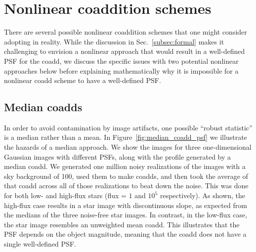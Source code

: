 \documentclass{openjournal}
\begin{document}
\section{Nonlinear coaddition schemes}\label{sec:nonlin}

There are several possible nonlinear coaddition schemes that one might consider adopting in reality.  While the discussion in Sec.~\ref{subsec:formal} makes it challenging to envision a nonlinear approach that would result in a well-defined PSF for the coadd, we discuss the specific issues with two potential nonlinear approaches below before explaining mathematically why it is impossible for a nonlinear coadd scheme to have a well-defined PSF.

\subsection{Median coadds}

In order to avoid contamination by image artifacts, one possible ``robust statistic'' is a median rather than a mean.  In Figure~\ref{fig:median_coadd_psf} we illustrate the hazards of a median approach.
We show the images for three one-dimensional Gaussian images with different PSFs, along with the profile generated by a median coadd.  We generated one million noisy realizations of the images with a sky background of 100,  used them to make coadds, and then took the average of that coadd across all of those realizations to beat down the noise.  This was done for both low- and high-flux stars (flux = $1$ and $10^5$ respectively).
As shown, the high-flux case results in a star image with discontinuous slope, as expected from the medians of the three noise-free star images.  In contrast, in the low-flux case, the star image resembles an unweighted mean coadd. 
This illustrates that the PSF depends on the object magnitude, meaning that the coadd does not have a single well-defined PSF.
\end{document}
